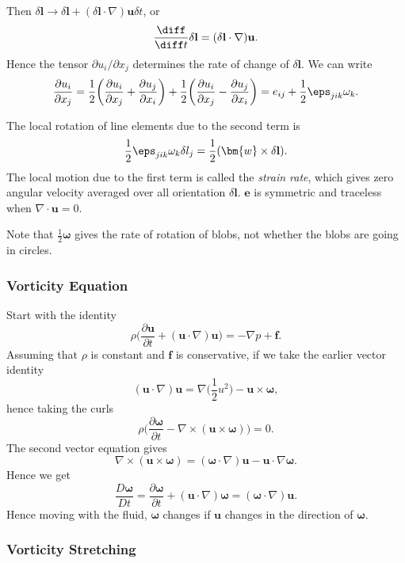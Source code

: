 \documentclass[12pt]{article}
\begin{document}
Then $\delta \mathbf{l} \to \delta \mathbf{l} + (\delta \mathbf{l} \cdot \nabla) \mathbf{u} \delta t$, or
\[
\frac{\diff}{\diff t} \delta \mathbf{l} = (\delta \mathbf{l} \cdot \nabla) \mathbf{u}
.\]
Hence the tensor $\partial u_i/\partial x_j$ determines the rate of change of $\delta \mathbf{l}$. We can write
\[
\frac{\partial u_i}{\partial x_j} = \frac{1}{2} \biggl( \frac{\partial u_i}{\partial x_j} + \frac{\partial u_j}{\partial x_i} \biggr) + \frac{1}{2} \biggl( \frac{\partial u_i}{\partial x_j} - \frac{\partial u_j}{\partial x_i} \biggr) = e_{ij} + \frac{1}{2} \eps_{jik} \omega_{k}
.\]


The local rotation of line elements due to the second term is
\[
\frac{1}{2} \eps_{jik}\omega_k \delta l_j = \frac{1}{2} (\bm{w} \times \delta \mathbf{l})
.\]
The local motion due to the first term is called the \emph{strain rate}, which gives zero angular velocity averaged over all orientation $\delta \mathbf{l}$. $\mathbf{e}$ is symmetric and traceless when $\nabla \cdot \mathbf{u} = 0$.

Note that $\frac{1}{2} \bm{\omega}$ gives the rate of rotation of blobs, not whether the blobs are going in circles.

\subsubsection{Vorticity Equation}
\label{subsub:vorticity_equation}

Start with the identity
\[
\rho \biggl( \frac{\partial \mathbf{u}}{\partial t} + (\mathbf{u} \cdot \nabla) \mathbf{u} \biggr) = - \nabla p + \mathbf{f}
.\]
Assuming that $\rho$ is constant and $\mathbf{f}$ is conservative, if we take the earlier vector identity
\[
	(\mathbf{u} \cdot \nabla) \mathbf{u} = \nabla \biggl( \frac{1}{2} u^2 \biggr) - \mathbf{u} \times \bm{\omega}
,\]
hence taking the curls
\[
\rho \biggl( \frac{\partial \bm{\omega}}{\partial t} - \nabla \times (\mathbf{u} \times \bm{\omega} )  \biggr) = 0
.\]
The second vector equation gives
\[
\nabla \times (\mathbf{u} \times \bm{\omega}) = (\bm{\omega} \cdot \nabla) \mathbf{u} - \mathbf{u} \cdot \nabla \bm{\omega}
.\]
Hence we get
\[
\frac{D \bm{\omega}}{D t} = \frac{\partial \bm{\omega}}{\partial t} + (\mathbf{u} \cdot \nabla) \bm{\omega} = (\bm{\omega} \cdot \nabla) \mathbf{u}
.\]
Hence moving with the fluid, $\bm{\omega}$ changes if $\mathbf{u}$ changes in the direction of $\bm{\omega}$.

\subsubsection{Vorticity Stretching}
\label{subsub:vorticity_stretching}
\end{document}

